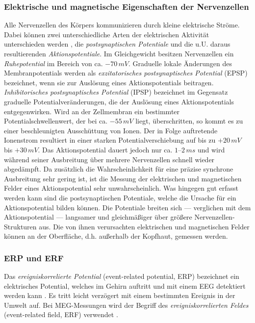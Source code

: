 \documentclass[doc,a4paper,12pt]{apa6}
\begin{document}
\subsubsection{Elektrische und magnetische Eigenschaften der Nervenzellen}

Alle Nervenzellen des Körpers kommunizieren durch kleine elektrische Ströme. Dabei können zwei unterschiedliche Arten der elektrischen Aktivität unterschieden werden \parencite{da1998biophysical}, die \emph{postsynaptischen Potentiale} und die u.U. daraus resultierenden \emph{Aktionspotentiale}. Im Gleichgewicht besitzen Nervenzellen ein \emph{Ruhepotential} im Bereich von ca. $-70\,mV$. Graduelle lokale Änderungen des Membranpotentials werden als \emph{exzitatorisches postsynaptisches Potential} (EPSP) bezeichnet, wenn sie zur Auslösung eines Aktionspotentials beitragen. \emph{Inhibitorisches postsynaptisches Potential} (IPSP) bezeichnet im Gegensatz graduelle Potentialveränderungen, die der Auslösung eines Aktionspotentials entgegenwirken. Wird an der Zellmembran ein bestimmter Potentialschwellenwert, der bei ca. $-55\,mV$ liegt, überschritten, so kommt es zu einer beschleunigten Ausschüttung von Ionen. Der in Folge auftretende Ionenstrom resultiert in einer starken Potentialverschiebung auf bis zu $+20\,mV$ bis $+30\,mV$. Das Aktionspotential dauert jedoch nur ca. $1$--$2\,ms$ und wird während seiner Ausbreitung über mehrere Nervenzellen schnell wieder abgedämpft. Da zusätzlich die Wahrscheinlichkeit für eine präzise synchrone Ausbreitung sehr gering ist, ist die Messung der elektrischen und magnetischen Felder eines Aktionspotential sehr unwahrscheinlich. Was hingegen gut erfasst werden kann sind die postsynaptischen Potentiale, welche die Ursache für ein Aktionspotential bilden können. Die Potentiale breiten sich --- verglichen mit dem Aktionspotential --- langsamer und gleichmäßiger über größere Nervenzellen-Strukturen aus. Die von ihnen verursachten elektrischen und magnetischen Felder können an der Oberfläche, d.h. außerhalb der Kopfhaut, gemessen werden.

\subsubsection{ERP und ERF}
\label{sec:erf}

Das \emph{ereigniskorrelierte Potential} (event-related potential, ERP) bezeichnet ein elektrisches Potential, welches im Gehirn auftritt und mit einem EEG detektiert werden kann \parencite{luck2014introduction}. Es tritt leicht verzögert mit einem bestimmten Ereignis in der Umwelt auf. Bei MEG-Messungen wird der Begriff des \emph{ereigniskorrelierten Feldes} (event-related field, ERF) verwendet \parencite{brown1999neurocognition}.
\end{document}

